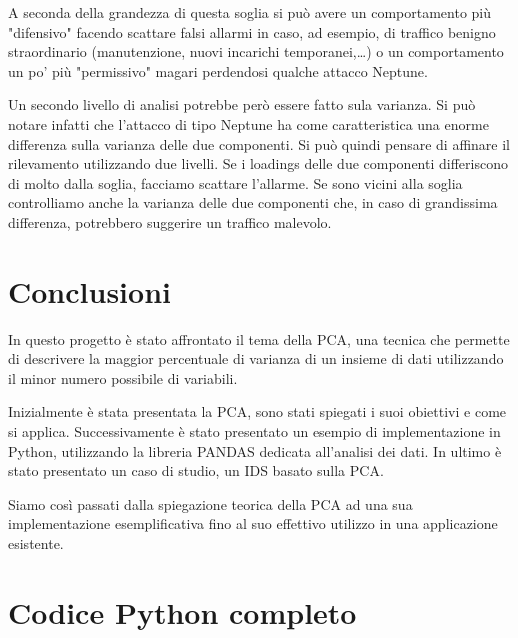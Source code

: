 \documentclass[12pt]{article}
\newcommand{\codice}[2]{}
\newcommand{\sectionline}{
	\begin{center}
		\resizebox{0.5\linewidth}{1ex}{
			\begin{tikzpicture}
			\node  (C) at (0,0) {};
			\node (D) at (9,0) {};
			\path (C) to [ornament=83] (D);
			\end{tikzpicture}
		}
	\end{center}
}
\begin{document}
			A seconda della grandezza di questa soglia si può avere un comportamento più "difensivo" facendo scattare falsi allarmi in caso, ad esempio, di traffico benigno straordinario (manutenzione, nuovi incarichi temporanei,\dots ) o un comportamento un po' più "permissivo" magari perdendosi qualche attacco Neptune.
			
			Un secondo livello di analisi potrebbe però essere fatto sula varianza. Si può notare infatti che l'attacco di tipo Neptune ha come caratteristica una enorme differenza sulla varianza delle due componenti. Si può quindi pensare di affinare il rilevamento utilizzando due livelli. Se i loadings delle due componenti differiscono di molto dalla soglia, facciamo scattare l'allarme. Se sono vicini alla soglia controlliamo anche la varianza delle due componenti che, in caso di grandissima differenza, potrebbero suggerire un traffico malevolo.

	\sectionline
			
\section{Conclusioni}
	In questo progetto è stato affrontato il tema della PCA, una tecnica che permette di descrivere la maggior percentuale di varianza di un insieme di dati utilizzando il minor numero possibile di variabili.
	
	Inizialmente è stata presentata la PCA, sono stati spiegati i suoi obiettivi e come si applica. Successivamente è stato presentato un esempio di implementazione in Python, utilizzando la libreria PANDAS dedicata all'analisi dei dati. In ultimo è stato presentato un caso di studio, un IDS basato sulla PCA.
	
	Siamo così passati dalla spiegazione teorica della PCA ad una sua implementazione esemplificativa fino al suo effettivo utilizzo in una applicazione esistente.
					
	\newpage

\section{Codice Python completo}
	\codice{1}{56}
	\newpage
	\codice{58}{123}
	\newpage
	\codice{125}{174}
	\newpage



\end{document}
